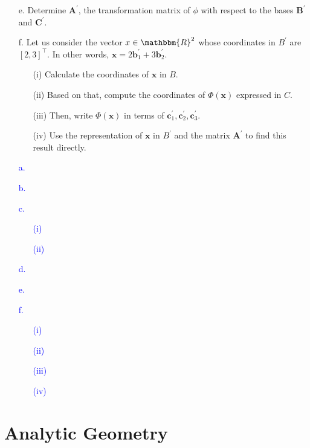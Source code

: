 \documentclass[a4paper,12pt]{article}
\newcommand{\R}{\mathbbm{R}}
\newcommand{\vecx}{\textbf{x}}
\newcommand{\vecb}{\textbf{b}}
\newcommand{\vecc}{\textbf{c}}
\newcommand{\matA}{\textbf{A}}
\newcommand{\pr}{^\prime}
\begin{document}
\begin{itemize}
 \item [e.]Determine $\matA\pr$, the transformation matrix of $\phi$ with respect to the bases $\textbf{B}\pr$ and $\textbf{C}\pr$.
 \item [f.] Let us consider the vector $x \in \R^2$ whose coordinates in $B\pr$ are $[2,3]^\top$. In other words, $\vecx = 2\vecb_1\pr +3\vecb_2\pr$.
 \begin{enumerate}
  \item [(i)] Calculate the coordinates of $\vecx$ in $B$.
  \item [(ii)] Based on that, compute the coordinates of $\Phi(\vecx)$ expressed in $C$.
  \item [(iii)] Then, write $\Phi(\vecx)$ in terms of $\vecc_1\pr, \vecc_2\pr, \vecc_3\pr$.
  \item [(iv)] Use the representation of $\vecx$ in $B\pr$ and the matrix $\matA\pr$ to find this result directly.
 \end{enumerate}
\end{itemize}
\textcolor{blue}{
\begin{itemize}
 \item [a.] 
 \item [b.] 
 \item [c.] 
 \begin{enumerate}
  \item [(i)] 
  \item [(ii)] 
 \end{enumerate}
 \item [d.] 
 \item [e.]
 \item[f.]
 \begin{enumerate}
  \item [(i)]
  \item [(ii)]
  \item [(iii)]
  \item [(iv)]
 \end{enumerate}
\end{itemize}
}

\newpage%
\section{Analytic Geometry}
\end{document}
